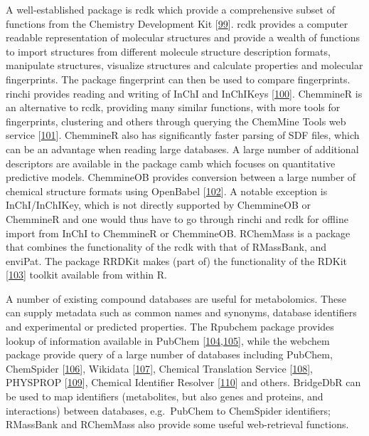 \documentclass[]{article}
\begin{document}
A well-established package is rcdk which provide a comprehensive subset of functions from the Chemistry Development Kit {[}\protect\hyperlink{ref-willighagen_2017}{99}{]}. rcdk provides a computer readable representation of molecular structures and provide a wealth of functions to import structures from different molecule structure description formats, manipulate structures, visualize structures and calculate properties and molecular fingerprints. The package fingerprint can then be used to compare fingerprints. rinchi provides reading and writing of InChI and InChIKeys {[}\protect\hyperlink{ref-heller_2015}{100}{]}. ChemmineR is an alternative to rcdk, providing many similar functions, with more tools for fingerprints, clustering and others through querying the ChemMine Tools web service {[}\protect\hyperlink{ref-backman_2011}{101}{]}. ChemmineR also has significantly faster parsing of SDF files, which can be an advantage when reading large databases. A large number of additional descriptors are available in the package camb which focuses on quantitative predictive models. ChemmineOB provides conversion between a large number of chemical structure formats using OpenBabel {[}\protect\hyperlink{ref-oboyle_2011}{102}{]}. A notable exception is InChI/InChIKey, which is not directly supported by ChemmineOB or ChemmineR and one would thus have to go through rinchi and rcdk for offline import from InChI to ChemmineR or ChemmineOB. RChemMass is a package that combines the functionality of the rcdk with that of RMassBank, and enviPat. The package RRDKit makes (part of) the functionality of the RDKit {[}\protect\hyperlink{ref-landrum_2016}{103}{]} toolkit available from within R.

A number of existing compound databases are useful for metabolomics. These can supply metadata such as common names and synonyms, database identifiers and experimental or predicted properties. The Rpubchem package provides lookup of information available in PubChem {[}\protect\hyperlink{ref-kim_2016}{104},\protect\hyperlink{ref-wang_2009}{105}{]}, while the webchem package provide query of a large number of databases including PubChem, ChemSpider {[}\protect\hyperlink{ref-pence_2010}{106}{]}, Wikidata {[}\protect\hyperlink{ref-erxleben_2014}{107}{]}, Chemical Translation Service {[}\protect\hyperlink{ref-wohlgemuth_2010}{108}{]}, PHYSPROP {[}\protect\hyperlink{ref-srcinc_website_nd}{109}{]}, Chemical Identifier Resolver {[}\protect\hyperlink{ref-ncicaddgroup_website_nd}{110}{]} and others. BridgeDbR can be used to map identifiers (metabolites, but also genes and proteins, and interactions) between databases, e.g.~PubChem to ChemSpider identifiers; RMassBank and RChemMass also provide some useful web-retrieval functions.
\end{document}
